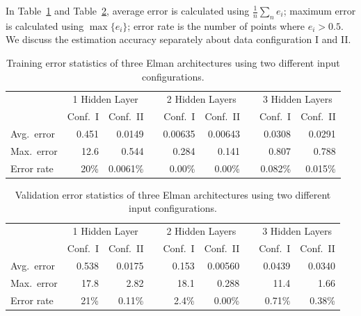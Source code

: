 In Table~\ref{tab:terr-stat} and Table~\ref{tab:verr-stat}, average
error is calculated using $\frac1n\sum_ne_i$; maximum error is
calculated using $\max\{e_i\}$; error rate is the number of points
where $e_i>0.5$. We discuss the estimation accuracy separately about
data configuration I and II.

\begin{table}[t]
    \centering
    \begingroup
    \setlength{\tabcolsep}{3.6pt} %
    \begin{tabular}{lrrcrrcrr}
        \toprule
        & \multicolumn{2}{c}{1 Hidden Layer} && \multicolumn{2}{c}{2 Hidden Layers} && \multicolumn{2}{c}{3 Hidden Layers}\\
        \cmidrule{2-3} \cmidrule{5-6} \cmidrule{8-9}
        & Conf.~I & Conf.~II && Conf.~I & Conf.~II && Conf.~I & Conf.~II\\
        \midrule
        Avg.~error & 0.451      & 0.0149    && 0.00635   & 0.00643   && 0.0308      & 0.0291    \\
        Max.~error & 12.6       & 0.544     && 0.284     & 0.141     && 0.807       & 0.788     \\
        Error rate & 20\%       & 0.0061\%  && 0.00\%    & 0.00\%    && 0.082\%     & 0.015\%   \\
        \bottomrule
    \end{tabular}
    \endgroup
    \caption{Training error statistics of three Elman architectures using two
        different input configurations.}
    \label{tab:terr-stat}
\end{table}

\begin{table}[t]
    \centering
    \begingroup
    \setlength{\tabcolsep}{3.6pt} %
    \begin{tabular}{lrrcrrcrr}
        \toprule
        & \multicolumn{2}{c}{1 Hidden Layer} && \multicolumn{2}{c}{2 Hidden Layers} && \multicolumn{2}{c}{3 Hidden Layers}\\
        \cmidrule{2-3} \cmidrule{5-6} \cmidrule{8-9}
        & Conf.~I & Conf.~II && Conf.~I & Conf.~II && Conf.~I & Conf.~II\\
        \midrule
        Avg.~error & 0.538      & 0.0175    && 0.153     & 0.00560   && 0.0439      & 0.0340    \\
        Max.~error & 17.8       & 2.82      && 18.1      & 0.288     && 11.4        & 1.66      \\
        Error rate & 21\%       & 0.11\%    && 2.4\%     & 0.00\%    && 0.71\%      & 0.38\%    \\
        \bottomrule
    \end{tabular}
    \endgroup
    \caption{Validation error statistics of three Elman architectures using two
        different input configurations.}
    \label{tab:verr-stat}
\end{table}

